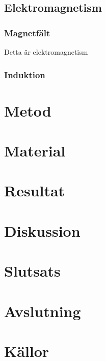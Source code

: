\documentclass[a4paper]{article}
\begin{document}
\subsection{Elektromagnetism}
\subsubsection{Magnetfält}
Detta är elektromagnetism
\subsubsection{Induktion}

\section{Metod}

\section{Material}

\section{Resultat}

\section{Diskussion}

\section{Slutsats}

\section{Avslutning}

\section{Källor}
\printbibliography[heading=none]
\end{document}
